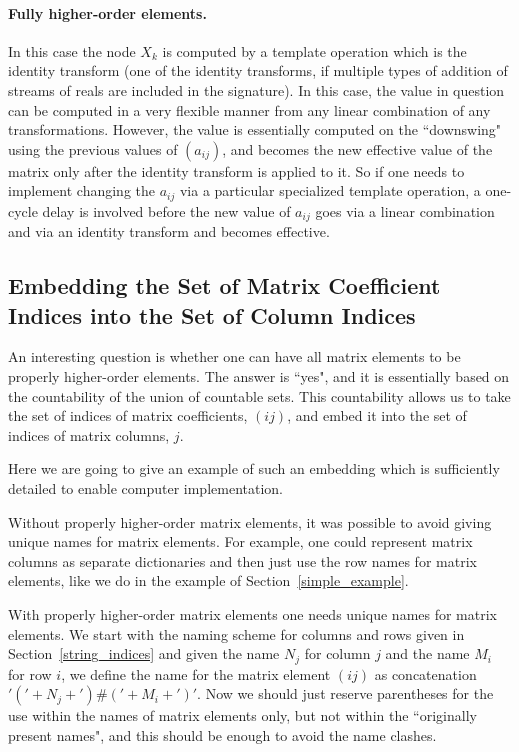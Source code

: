 \documentclass[withtimes]{easychair}
\begin{document}
\paragraph{Fully higher-order elements.} In this case the node $X_k$ is computed by a template operation which
is the identity transform (one of the identity transforms, if multiple types of addition of streams of reals
are included in the signature). In this case, the value in question can be computed in a very flexible
manner from any linear combination of any transformations. However, the value is essentially
computed on the ``downswing" using the previous values of $(a_{ij})$, and becomes the new effective
value of the matrix only after the identity transform is applied to it. So if one needs to implement
changing the $a_{ij}$ via a particular specialized template operation, a one-cycle delay is
involved before the new value of $a_{ij}$ goes via a linear combination and via an identity transform and becomes effective.

\subsection{Embedding the Set of Matrix Coefficient Indices into the Set of Column Indices}\label{countable_embedding} 

An interesting question is whether one can have all matrix elements to be properly higher-order elements.
The answer is ``yes", and it is essentially based on the countability of the union of countable sets.
This countability allows us to take the set of indices of matrix coefficients, $(ij)$, and embed it into the set
of indices of matrix columns, $j$.

Here we are going to give an example of such an embedding which is sufficiently detailed to enable computer
implementation.

Without properly higher-order matrix elements, it was possible to avoid giving unique names for matrix elements.
For example, one could represent matrix columns as separate dictionaries and then just use the row names
for matrix elements, like we do in the example of Section~\ref{simple_example}.

With properly higher-order matrix elements one needs unique names for matrix elements. We start with
the naming scheme for columns and rows given in Section~\ref{string_indices} and given the name $N_j$ for
column $j$ and the name $M_i$ for row $i$, we define the name for the matrix element $(ij)$ as concatenation
$'('+N_j+')\#('+M_i+')'$. Now we should just reserve parentheses for the use within the names of matrix elements
only, but not within the ``originally present names", and this should be enough to avoid the name clashes.
\end{document}
